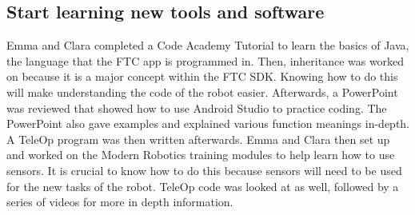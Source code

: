 \documentclass{article}
\begin{document}
\subsection{Start learning new tools and software}
Emma and Clara completed a Code Academy Tutorial to learn the basics of Java, the language that the FTC app is programmed in. Then, inheritance was worked on because it is a major concept within the FTC SDK. Knowing how to do this will make understanding the code of the robot easier. Afterwards, a PowerPoint was reviewed that showed how to use Android Studio to practice coding.  The PowerPoint also gave examples and explained various function meanings in-depth. A TeleOp program was then written afterwards. Emma and Clara then set up and worked on the Modern Robotics training modules to help learn how to use sensors. It is crucial to know how to do this because sensors will need to be used for the new tasks of the robot. TeleOp code was looked at as well, followed by a series of videos for more in depth information.
\end{document}
